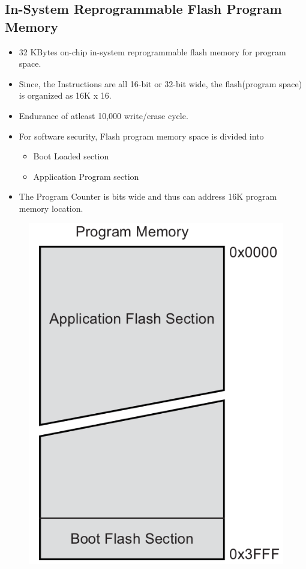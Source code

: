 \documentclass{article}
\begin{document}
\subsection{In-System Reprogrammable Flash Program Memory}
\begin{itemize}
    \item 32 KBytes on-chip in-system reprogrammable flash memory for program space.
    \item Since, the Instructions are all 16-bit or  32-bit wide, the flash(program space) is organized as 16K x 16.
    \item Endurance of atleast 10,000 write/erase cycle.
    \item For software security, Flash program memory space is divided into
    \begin{itemize}
        \item Boot Loaded section
        \item Application Program section
    \end{itemize}
    \item The Program Counter is bits wide and thus can address 16K program memory location.\end{itemize}

\begin{figure}[H]
    \begin{center}
        \includegraphics[height=0.27\textheight]{programMemoryFlash.png}
    \end{center}
\end{figure}
\end{document}
